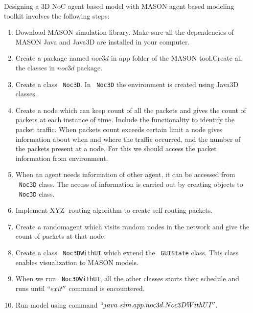 Designing a 3D NoC agent based model with MASON agent based modeling toolkit involves the following steps:

\begin{enumerate}
 \item Download MASON simulation library. Make sure all the dependencies of MASON Java and Java3D are installed in your computer.
 \item Create a package named $noc3d$ in app folder of the MASON tool.Create all the classes in $noc3d$ package.
 \item Create a class ~\texttt{Noc3D}. In ~\texttt{Noc3D} the environment is created using Java3D classes.
 \item Create a node which can keep count of all the packets and gives the count of packets at each instance of time. Include the functionality to identify the packet traffic. When packets count exceeds certain limit a node gives information about when and where the traffic occurred, and the number of the packets present at a node. For this we should access the packet information from environment.
 \item When an agent needs information of other agent, it can be accessed from ~\texttt{Noc3D} class. The access of information is carried out by creating objects to ~\texttt{Noc3D} class.
 \item Implement XYZ- routing algorithm to create self routing packets.
 \item Create a randomagent which visits random nodes in the network and give the count of packets at that node.
 \item Create a class ~\texttt{Noc3DWithUI} which extend the ~\texttt{GUIState} class. This class enables visualization to MASON models.
 \item When we run ~\texttt{Noc3DWithUI}, all the other classes starts their schedule and runs until $``exit''$ command is encountered.
 \item Run model using command $``java~sim.app.noc3d.Noc3DWithUI''$.
\end{enumerate}









